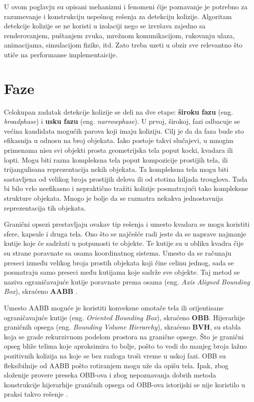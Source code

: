 \documentclass[12pt,oneside]{memoir}
\begin{document}
U ovom poglavju su opisani mehanizmi i fenomeni čije poznavanje je potrebno za razumevanje i konstrukciju 
uspešnog rešenja za detekciju kolizije.
Algoritam detekcije kolizije se ne koristi u izolaciji nego se izvršava zajedno sa renderovanjem,
puštanjem zvuka, mrežnom komunikacijom, rukovanju ulaza, animacijama, simulacijom fizike, itd. 
Zato treba uzeti u obzir sve relevantno što utiče na performanse implementaicije.

\section{Faze}

Celokupan zadatak detekcije kolizije se deli na dve etape: \textbf{ široku fazu }(eng. {\em broadphase}) i \textbf{usku fazu} (eng. {\em narrowphase}). 
U prvoj, širokoj, fazi odbacuje se većina kandidata mogućih parova koji imaju koliziju. Cilj je da 
da faza bude sto efikasnija u odnosu na broj objekata.
Iako postoje takvi slučajevi, u mnogim primenama nisu svi objekti prosta geometrijska tela poput kocki, kvadara ili lopti.
Mogu biti razna kompleksna tela poput kompozicije prostijih tela, ili trijangulisana reprezentacija 
nekih objekata. Ta kompleksna tela mogu biti sastavljena od velikog broja prostijih delova ili
od stotina hiljada trouglova. Tada bi bilo vrlo neefikasno i nepraktično tražiti kolizije posmatrajući
tako kompleksne strukture objekata. Mnogo je bolje da se razmatra nekakva jednostavnija reprezentacija tih objekata.

Granični opsezi prestavljaju ovakav tip rešenja i umesto kvadara se mogu koristiti sfere, kapsule i druga tela.
Ono što se najčešće radi jeste da se naprave najmanje kutije koje će sadržati u potpunosti te objekte.
Te kutije su u obliku kvadra čije su strane poravnate sa osama koordinatnog sistema. 
Umesto da se računaju preseci između velikog broja prostih objekata koji čine celinu jednog, sada se posmatraju 
samo preseci među kutijama koje sadrže sve objekte. Taj metod se naziva ograničavajuće kutije
poravnate prema osama (eng. {\em Axis Aligned Bounding Box}), skraćeno \textbf{ AABB }.

Umesto AABB moguće je koristiti konveksne omotače tela ili orijentisane ograničavajuće kutije (eng. {\em Oriented Bounding Box}), skraćeno \textbf{OBB}.
Hijerarhije graničnih opsega (eng. {\em Bounding Volume Hierarchy}), skraćeno \textbf{BVH}, su stabla koja se grade rekurzivnom podelom 
prostora na granične opsege. Što je granični opseg bliže telima koje aproksimira to bolje, pošto to vodi do manjeg broja 
lažno pozitivnih kolizija na koje se bez razloga troši vreme u uskoj fazi. OBB su fleksibilnije od AABB pošto rotiranjem 
mogu uže da opišu tela. Ipak, zbog složenije provere preseka OBB-ova i zbog nepoznavanja dobrih metoda konstrukcije hijerarhije graničnih
opsega od OBB-ova istorijski se nije koristilo u praksi takvo rešenje \cite{obb}. 
\end{document}
